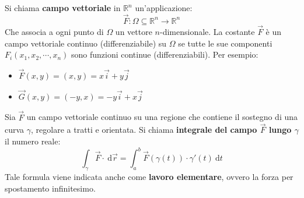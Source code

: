 \documentclass[a4paper]{article}
\newcommand{\definition}[1]{\textcolor{Red3}{\textbf{#1}}}
\begin{document}
	Si chiama \definition{campo vettoriale} in $\mathbb{R}^{n}$ un'applicazione:
	\begin{equation*}
		\overset{\rightarrow}{F} : \Omega \subseteq \mathbb{R}^{n} \rightarrow \mathbb{R}^{n}
	\end{equation*}
	Che associa a ogni punto di $\Omega$ un vettore $n$-dimensionale. La costante $\overset{\rightarrow}{F}$ è un campo vettoriale continuo (differenziabile) su $\Omega$ se tutte le sue componenti $F_{i}\left(x_{1}, x_{2}, \cdots, x_{n}\right)$ sono funzioni continue (differenziabili). Per esempio:
	\begin{itemize}
		\item $\overset{\rightarrow}{F}\left(x,y\right) = \left(x,y\right) = x\overset{\rightarrow}{i}+y\overset{\rightarrow}{j}$
		\item $\overset{\rightarrow}{G}\left(x,y\right) = \left(-y,x\right) = -y\overset{\rightarrow}{i}+x\overset{\rightarrow}{j}$
	\end{itemize}

	\begin{boxdef}
		Sia $\overset{\rightarrow}{F}$ un campo vettoriale continuo su una regione che contiene il sostegno di una curva $\gamma$, regolare a tratti e orientata. Si chiama \definition{integrale del campo $\overset{\rightarrow}{F}$ lungo $\gamma$} il numero reale:
		\begin{equation}\label{eq: integrale di linea del campo lungo la parametrizzazione}
			\displaystyle\int_{\gamma} \overset{\rightarrow}{F} \cdot \:\mathrm{d}\overset{\rightarrow}{r} 
			=
			\displaystyle\int_{a}^{b} \overset{\rightarrow}{F}\left(\gamma\left(t\right)\right) \cdot \gamma'\left(t\right) \:\mathrm{d}t
		\end{equation}
		Tale formula viene indicata anche come \definition{lavoro elementare}, ovvero la forza per spostamento infinitesimo.
	\end{boxdef}
\end{document}
